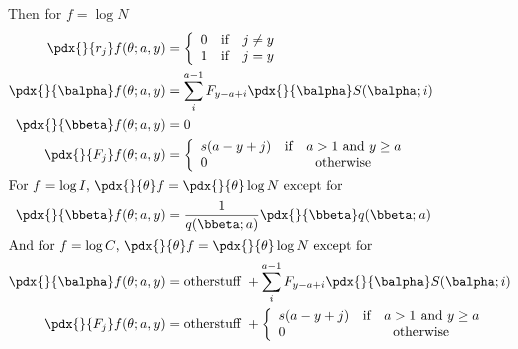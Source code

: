 \documentclass[a4paper,english]{article}
\begin{document}
Then for $f = \log N$
\begin{align}
  \pdx{}{r_j}f(\theta;a,y) &= \left\lbrace \begin{array}{ll} 0 & \text{if} \quad j \neq y \\ 1 & \text{if} \quad j = y \end{array} \right. \\
  \pdx{}{\balpha}f(\theta;a,y) &= \sum_i^{a-1} F_{y-a+i} \pdx{}{\balpha}S(\balpha;i) \\
  \pdx{}{\bbeta}f(\theta;a,y) &= 0 \\
  \pdx{}{F_j}f(\theta;a,y) &= \left\lbrace \begin{array}{lc} s(a-y+j) & \text{if} \quad a>1 \text{ and } y \geq a \\ 0 & \text{otherwise} \end{array} \right. \\
\intertext{For $f = \log I$, $\pdx{}{\theta}f = \pdx{}{\theta} \log N$ except for}
  \pdx{}{\bbeta}f(\theta;a,y) &= \frac{1}{q(\bbeta;a)} \pdx{}{\bbeta} q(\bbeta;a) \\
\intertext{And for $f = \log C$, $\pdx{}{\theta}f = \pdx{}{\theta} \log N$ except for}
  \pdx{}{\balpha}f(\theta;a,y) &= \text{otherstuff } + \sum_i^{a-1} F_{y-a+i} \pdx{}{\balpha}S(\balpha;i) \\
  \pdx{}{F_j}f(\theta;a,y) &= \text{otherstuff } + \left\lbrace \begin{array}{lc} s(a-y+j) & \text{if} \quad a>1 \text{ and } y \geq a \\ 0 & \text{otherwise} \end{array} \right. \\
\end{align}

\fi




\end{document}
